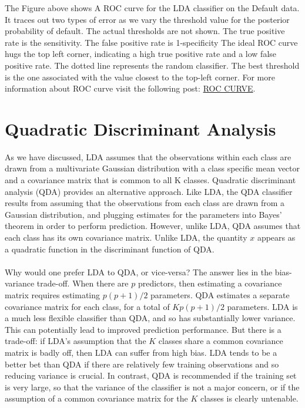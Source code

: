 The Figure above shows A ROC curve for the LDA classifier on the Default data. It traces out two types of error as we vary the threshold value for the posterior probability of default. The actual thresholds are not shown. The true positive rate
is the sensitivity. The false positive rate is 1-specificity  The ideal ROC curve hugs the top left corner, indicating a high true positive rate and a low false positive rate. The dotted line represents the random classifier. The best threshold is the one associated with the value closest to the top-left corner. For more information about ROC curve visit the following post: \href{https://towardsdatascience.com/understanding-auc-roc-curve-68b2303cc9c5}{ROC CURVE}.

\section{Quadratic Discriminant Analysis}
As we have discussed, LDA assumes that the observations within each class are drawn from a multivariate Gaussian distribution with a class specific mean vector and a covariance matrix that is common to all K classes. Quadratic discriminant analysis (QDA) provides an alternative approach. Like LDA, the QDA classifier results from assuming that the observations from each class are drawn from a Gaussian distribution, and plugging estimates for the parameters into Bayes’ theorem in order to perform prediction. However, unlike LDA, QDA assumes that each class has its own covariance matrix. Unlike LDA, the quantity $x$ appears as a quadratic function in the discriminant function of QDA.\\\\
Why would one prefer LDA to QDA, or vice-versa? The answer lies in the bias-variance trade-off. When there are $p$ predictors, then estimating a covariance matrix requires estimating $p(p+1)/2$ parameters. QDA estimates a separate covariance matrix for each class, for a total of $Kp(p+1)/2$ parameters.  LDA is a much less flexible classifier than QDA, and so has substantially lower variance. This can potentially lead to improved prediction performance. But there is a trade-off: if LDA’s assumption that the $K$ classes share a common covariance matrix is badly off, then LDA can suffer from high bias. LDA tends to be a better bet than QDA if there are relatively few training observations and so reducing variance is crucial. In contrast, QDA is recommended if the training set is very large, so that the variance of the classifier is not a major concern, or if the assumption of a common covariance matrix for the $K$ classes is clearly untenable.

